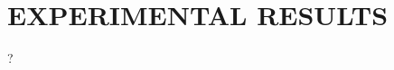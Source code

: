 \documentclass[a4paper,twoside]{article}
\begin{document}
\section{\uppercase{Experimental Results}}

?





\end{document}
